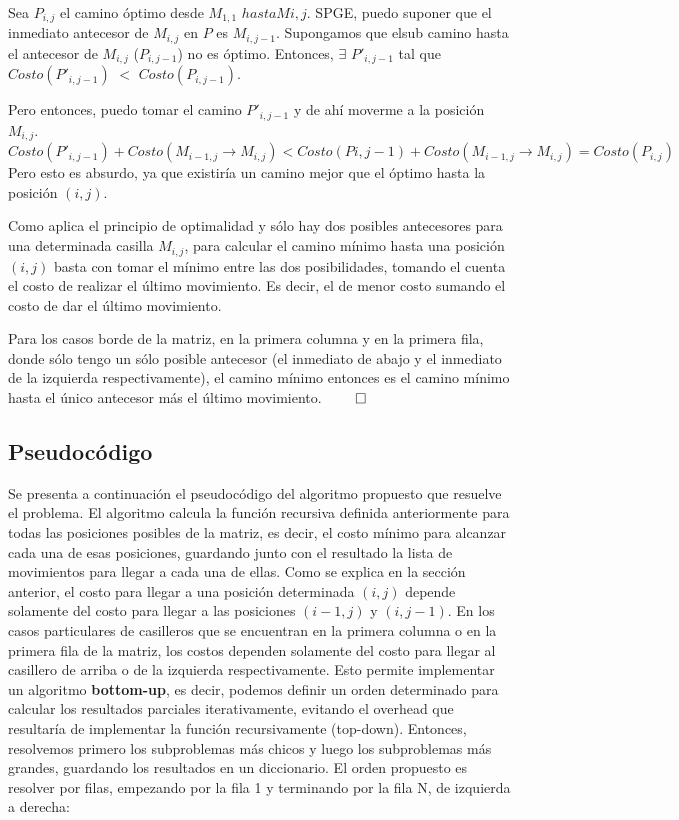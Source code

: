 Sea $P_{i,j}$ el camino óptimo desde $M_{1,1}$ $hasta M{i,j}$.
SPGE, puedo suponer que el inmediato antecesor de $M_{i,j}$ en $P$ es $M_{i, j-1}$. Supongamos que elsub camino hasta el antecesor de $M_{i,j}$ ($P_{i,j-1}$)  no es óptimo. Entonces, $\exists$ $P\prime_{i,j-1}$ tal que $Costo(P\prime_{i,j-1})$ $<$ $Costo(P_{i,j-1})$.

Pero entonces, puedo tomar el camino  $P\prime_{i,j-1}$ y de ahí moverme a la posición $M_{i,j}$. 
$Costo (P\prime_{i,j-1}) + Costo(M_{i-1,j} \rightarrow M_{i,j}) < Costo (P{i,j-1}) + Costo(M_{i-1,j} \rightarrow M_{i,j}) = Costo(P_{i,j})$
Pero esto es absurdo, ya que existiría un camino mejor que el óptimo hasta la posición $(i,j)$.

Como aplica el principio de optimalidad y sólo hay dos posibles antecesores para una determinada casilla $M_{i,j}$, para calcular el camino mínimo hasta una posición $(i,j)$ basta con tomar el mínimo entre las dos posibilidades, tomando el cuenta el costo de realizar el último movimiento. Es decir, el de menor costo sumando el costo de dar el último movimiento.

Para los casos borde de la matriz, en la primera columna y en la primera fila, donde sólo tengo un sólo posible antecesor (el inmediato de abajo y el inmediato de la izquierda respectivamente), el camino mínimo entonces es el camino mínimo hasta el único antecesor más el último movimiento. $\qed$

\subsection{Pseudocódigo}

Se presenta a continuación el pseudocódigo del algoritmo propuesto que resuelve el problema. El algoritmo calcula la función recursiva definida anteriormente para todas las posiciones posibles de la matriz, es decir, el costo mínimo para alcanzar cada una de esas posiciones, guardando junto con el resultado la lista de movimientos para llegar a  cada una de ellas. 
Como se explica en la sección anterior, el costo para llegar a una posición determinada $(i,j)$ depende solamente del costo para llegar a las posiciones $(i-1, j)$ y $(i,j-1)$. En los casos particulares de casilleros que se encuentran en la primera columna o en la primera fila de la matriz, los costos dependen solamente del costo para llegar al casillero de arriba o de la izquierda respectivamente. Esto permite implementar un algoritmo \textbf{bottom-up}, es decir, podemos definir un orden determinado para calcular los resultados parciales iterativamente, evitando el overhead que resultaría de implementar la función recursivamente (top-down). Entonces, resolvemos primero los subproblemas más chicos y luego los subproblemas más grandes, guardando los resultados en un diccionario. El orden propuesto es resolver por filas, empezando por la fila 1 y terminando por la fila N, de izquierda a derecha:

